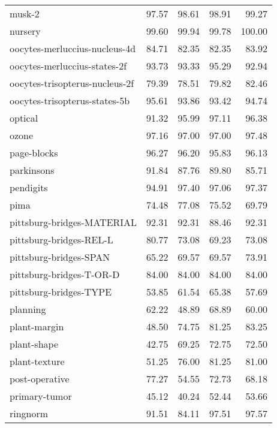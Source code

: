 \begin{longtable}{lrrrr}
                        musk-2 &   97.57 &    98.61 &  98.91 &  99.27 \\
                       nursery &   99.60 &    99.94 &  99.78 & 100.00 \\
 oocytes-merluccius-nucleus-4d &   84.71 &    82.35 &  82.35 &  83.92 \\
  oocytes-merluccius-states-2f &   93.73 &    93.33 &  95.29 &  92.94 \\
oocytes-trisopterus-nucleus-2f &   79.39 &    78.51 &  79.82 &  82.46 \\
 oocytes-trisopterus-states-5b &   95.61 &    93.86 &  93.42 &  94.74 \\
                       optical &   91.32 &    95.99 &  97.11 &  96.38 \\
                         ozone &   97.16 &    97.00 &  97.00 &  97.48 \\
                   page-blocks &   96.27 &    96.20 &  95.83 &  96.13 \\
                    parkinsons &   91.84 &    87.76 &  89.80 &  85.71 \\
                     pendigits &   94.91 &    97.40 &  97.06 &  97.37 \\
                          pima &   74.48 &    77.08 &  75.52 &  69.79 \\
    pittsburg-bridges-MATERIAL &   92.31 &    92.31 &  88.46 &  92.31 \\
       pittsburg-bridges-REL-L &   80.77 &    73.08 &  69.23 &  73.08 \\
        pittsburg-bridges-SPAN &   65.22 &    69.57 &  69.57 &  73.91 \\
      pittsburg-bridges-T-OR-D &   84.00 &    84.00 &  84.00 &  84.00 \\
        pittsburg-bridges-TYPE &   53.85 &    61.54 &  65.38 &  57.69 \\
                      planning &   62.22 &    48.89 &  68.89 &  60.00 \\
                  plant-margin &   48.50 &    74.75 &  81.25 &  83.25 \\
                   plant-shape &   42.75 &    69.25 &  72.75 &  72.50 \\
                 plant-texture &   51.25 &    76.00 &  81.25 &  81.00 \\
                post-operative &   77.27 &    54.55 &  72.73 &  68.18 \\
                 primary-tumor &   45.12 &    40.24 &  52.44 &  53.66 \\
                      ringnorm &   91.51 &    84.11 &  97.51 &  97.57 \\

\end{longtable}
